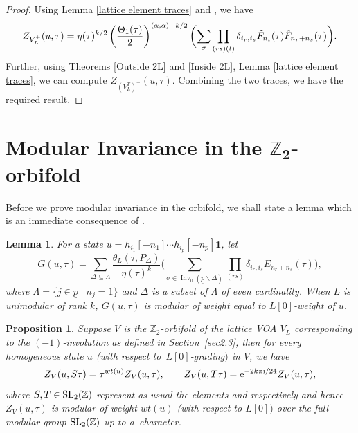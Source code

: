 \documentclass[pdftex]{sigma}
\numberwithin{equation}{section}
\newtheorem{Lemma}[Theorem]{Lemma}
\newtheorem{Proposition}[Theorem]{Proposition}
\theoremstyle{definition}
\begin{document}
\begin{proof}
 Using Lemma \ref{lattice element traces} and \cite[Theorem 19]{Mason20231-PointAlgebras}, we have
 \[Z_{V_L^+}(u,\tau)=\eta(\tau)^{k/2}\left(\frac{\Theta_1(\tau)}{2}\right)^{\langle\alpha,\alpha\rangle-k/2}\biggl(\sum_{\sigma} \prod_{(rs)(t)}\delta_{i_r,i_s}\Tilde{F}_{n_t}(\tau)\hat{F}_{n_r+n_s}(\tau)\biggr).\]
 Further, using Theorems \ref{Outside 2L} and \ref{Inside 2L}, Lemma \ref{lattice element traces}, we can compute $Z_{(V_L^T)^+}(u,\tau)$. Combining the two traces, we have the required result.
\end{proof}

\section[Modular invariance in the Z\_2-orbifold]{Modular Invariance in the $\boldsymbol{\mathbb{Z}_2}$-orbifold}\label{sec6}

Before we prove modular invariance in the orbifold, we shall state a lemma which is an immediate consequence of \cite[Proposition 23]{Mason20231-PointAlgebras}.

\begin{Lemma}\label{lemma G}
 For a state
$u=h_{i_1}[-n_1]\cdots h_{i_p}[-n_p]\mathbf{1}$,
 let \[G(u,\tau)=\sum_{\Delta\subseteq \Lambda}\frac{\theta_L(\tau,P_{\Delta})}{\eta(\tau)^k}\biggl(\sum_{\sigma\in \operatorname{Inv}_0(\underline{p}\backslash \Delta)}\prod_{(rs)}\delta_{i_r,i_s}\hat{E}_{n_r+n_s}(\tau)\biggr),\]
 where $\Lambda=\{ j\in \underline{p}\mid n_j=1\}$ and $\Delta$ is a subset of $\Lambda$ of even cardinality.
 When $L$ is unimodular of rank $k$, $G(u,\tau)$ is modular of weight equal to $L[0]$-weight of $u$.
\end{Lemma}

\begin{Proposition}\label{proposition1}
 Suppose $V$ is the $\mathbb{Z}_2$-orbifold of the lattice VOA $V_L$ corresponding to the $(-1)$-involution as defined in Section~{\rm\ref{sec2.3}}, then for every homogeneous state $u$ {\rm(}with respect to~$L[0]$-grading$)$ in $V$, we have
 \[Z_V(u,S\tau)=\tau^{wt(u)}Z_V(u,\tau),\qquad
 Z_V(u,T\tau)={\rm e}^{-2k\pi {\rm i}/24}Z_V(u,\tau),\]
 where $S,T\in {\rm SL}_2(\mathbb{Z})$ represent as usual the elements  and
  respectively and hence $Z_V(u,\tau)$ is modular of weight $wt(u)$ {\rm(}with respect to $L[0])$ over the full modular group ${\rm SL}_2(\mathbb{Z})$ up to a~character.
\end{Proposition}
\end{document}
